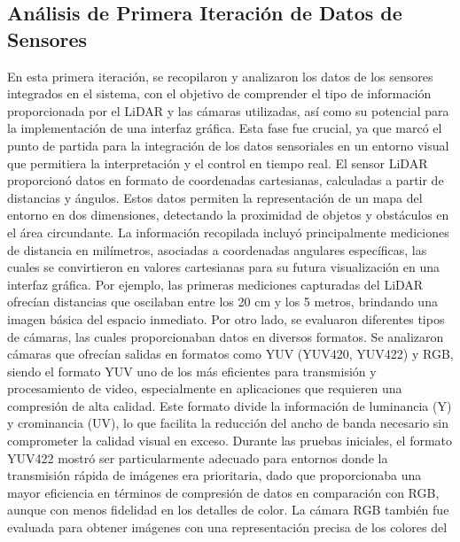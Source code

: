 \subsection{An\'alisis de Primera Iteraci\'on de Datos de Sensores } %
    En esta primera iteraci\'on, se recopilaron y analizaron los datos de los sensores 
        integrados en el sistema, con el objetivo de comprender el tipo de informaci\'on 
        proporcionada por el LiDAR y las c\'amaras utilizadas, as\'i como su potencial para la 
        implementaci\'on de una interfaz gr\'afica. Esta fase fue crucial, ya que marc\'o el punto 
        de partida para la integraci\'on de los datos sensoriales en un entorno visual que permitiera 
        la interpretaci\'on y el control en tiempo real.
    \vskip 0.5cm
    El sensor LiDAR proporcion\'o datos en formato de coordenadas cartesianas, calculadas a 
        partir de distancias y \'angulos. Estos datos permiten la representaci\'on de un mapa 
        del entorno en dos dimensiones, detectando la proximidad de objetos y obst\'aculos 
        en el \'area circundante. La informaci\'on recopilada incluy\'o principalmente mediciones 
        de distancia en mil\'imetros, asociadas a coordenadas angulares espec\'ificas, las cuales 
        se convirtieron en valores cartesianas para su futura visualizaci\'on en una interfaz gr\'afica. 
        Por ejemplo, las primeras mediciones capturadas del LiDAR ofrec\'ian distancias que oscilaban 
        entre los 20 cm y los 5 metros, brindando una imagen b\'asica del espacio inmediato.
    \vskip 0.5cm
    Por otro lado, se evaluaron diferentes tipos de c\'amaras, las cuales proporcionaban datos en diversos 
        formatos. Se analizaron c\'amaras que ofrec\'ian salidas en formatos como YUV (YUV420, YUV422) y 
        RGB, siendo el formato YUV uno de los m\'as eficientes para transmisi\'on y procesamiento de video, 
        especialmente en aplicaciones que requieren una compresi\'on de alta calidad. Este formato divide la 
        informaci\'on de luminancia (Y) y crominancia (UV), lo que facilita la reducci\'on del ancho de banda 
        necesario sin comprometer la calidad visual en exceso. Durante las pruebas iniciales, el formato YUV422 
        mostr\'o ser particularmente adecuado para entornos donde la transmisi\'on r\'apida de im\'agenes era prioritaria, 
        dado que proporcionaba una mayor eficiencia en t\'erminos de compresi\'on de datos en comparaci\'on con RGB, 
        aunque con menos fidelidad en los detalles de color.
    \vskip 0.5cm
    La c\'amara RGB tambi\'en fue evaluada para obtener im\'agenes con una representaci\'on precisa de los colores del 
